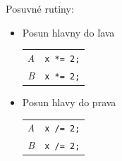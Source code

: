 \documentclass[11pt,a4paper]{article}
\begin{document}
Posuvné rutiny:
\begin{itemize}
    \item Posun hlavny do ľava
        \begin{flushright}
        \begin{minipage}{0.90\textwidth}
            \begin{tabular}{r|l}
                \textit{A} & \texttt{x *= 2;}\\
                \textit{B} & \texttt{x *= 2;}
            \end{tabular}
        \end{minipage}
        \end{flushright}
    \item Posun hlavy do prava
        \begin{flushright}
        \begin{minipage}{0.90\textwidth}
            \begin{tabular}{r|l}
                \textit{A} & \texttt{x /= 2;}\\
                \textit{B} & \texttt{x /= 2;}
            \end{tabular}
        \end{minipage}
        \end{flushright}
\end{itemize}
\end{document}

